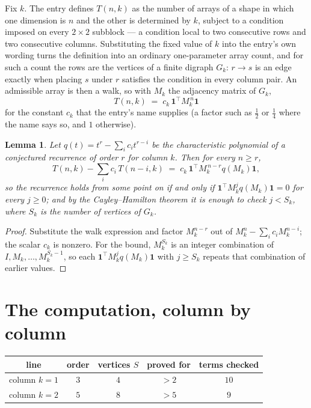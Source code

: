 \documentclass[11pt,a4paper]{article}
\theoremstyle{plain}
\newtheorem{lemma}[theorem]{Lemma}
\theoremstyle{definition}
\begin{document}
Fix $k$. The entry defines $T(n,k)$ as the number of arrays of a shape in which one dimension
is $n$ and the other is determined by $k$, subject to a condition imposed on every
$2\times2$ subblock --- a condition local to two consecutive rows and two consecutive columns.
Substituting the fixed value of $k$ into the entry's own wording turns the definition into an
ordinary one-parameter array count, and for such a count the rows are the vertices of a finite
digraph $G_k$: $r\to s$ is an edge exactly when placing $s$ under $r$ satisfies the condition
in every column pair. An admissible array is then a walk, so with $M_k$ the adjacency matrix
of $G_k$,
\[
T(n,k)\;=\;c_k\,\mathbf{1}^{\!\top}M_k^{\,n}\mathbf{1}
\]
for the constant $c_k$ that the entry's name supplies (a factor such as $\tfrac12$ or
$\tfrac14$ where the name says so, and $1$ otherwise).

\begin{lemma}\label{lem:crit}
Let $q(t)=t^{r}-\sum_i c_it^{r-i}$ be the characteristic polynomial of a conjectured
recurrence of order $r$ for column $k$. Then for every $n\ge r$,
\[
T(n,k)-\sum_i c_i\,T(n-i,k)\;=\;c_k\,\mathbf{1}^{\!\top}M_k^{\,n-r}q(M_k)\mathbf{1},
\]
so the recurrence holds from some point on if and only if
$\mathbf{1}^{\!\top}M_k^{j}q(M_k)\mathbf{1}=0$ for every $j\ge0$; and by the
Cayley--Hamilton theorem it is enough to check $j<S_k$, where $S_k$ is the number of vertices
of $G_k$.
\end{lemma}

\begin{proof}
Substitute the walk expression and factor $M_k^{n-r}$ out of $M_k^{n}-\sum_ic_iM_k^{n-i}$;
the scalar $c_k$ is nonzero. For the bound, $M_k^{S_k}$ is an integer combination of
$I,M_k,\dots,M_k^{S_k-1}$, so each $\mathbf{1}^{\!\top}M_k^{j}q(M_k)\mathbf{1}$ with
$j\ge S_k$ repeats that combination of earlier values.
\end{proof}

\section{The computation, column by column}

\begin{center}
\begin{tabular}{ccccc}
line & order & vertices $S$ & proved for & terms checked \\ \hline
column $k$$=1$ & $3$ & $4$ & $>2$ & $10$ \\
column $k$$=2$ & $5$ & $8$ & $>5$ & $9$ \\
\end{tabular}
\end{center}
\end{document}
